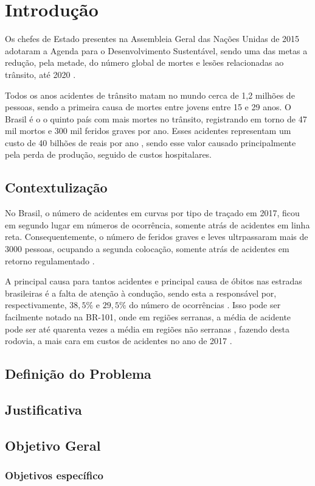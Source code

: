 \chapter{Introdução}

Os chefes de Estado presentes na Assembleia Geral das Nações Unidas de 2015 adotaram a Agenda para o Desenvolvimento Sustentável, sendo uma das metas a redução, pela metade, do número global de mortes e lesões relacionadas ao trânsito, até 2020 \cite{relatorio_oms}.

Todos os anos acidentes de trânsito matam no mundo cerca de 1,2 milhões de pessoas, sendo a primeira causa de mortes entre jovens entre 15 e 29 anos. O Brasil é o o quinto país com mais mortes no trânsito, registrando em torno de 47 mil mortos e 300 mil feridos graves por ano. Esses acidentes representam um custo de 40 bilhões de reais por ano \cite{relatorio_ipea}, sendo esse valor causado principalmente pela perda de produção, seguido de custos hospitalares.

\section{Contextulização}

No Brasil, o número de acidentes em curvas por tipo de traçado em 2017, ficou em segundo lugar em números de ocorrência, somente atrás de acidentes em linha reta. Consequentemente, o número de feridos graves e leves ultrpassaram mais de 3000 pessoas, ocupando a segunda colocação, somente atrás de acidentes em retorno regulamentado \cite{anuario_rodoviario}.

A principal causa para tantos acidentes e principal causa de óbitos nas estradas brasileiras é a falta de atenção à condução, sendo esta a responsável por, respectivamente, $38,5\%$ e $29,5\%$ do número de ocorrências \cite{anuario_rodoviario}. Isso pode ser facilmente notado na BR-101, onde em regiões serranas, a média de acidente pode ser até quarenta vezes a média em regiões não serranas \cite{acidentes}, fazendo desta rodovia, a mais cara em custos de acidentes no ano de 2017 \cite{anuario_rodoviario}.


\section{Definição do Problema}
\section{Justificativa}
\section{Objetivo Geral}
\subsection{Objetivos específico}